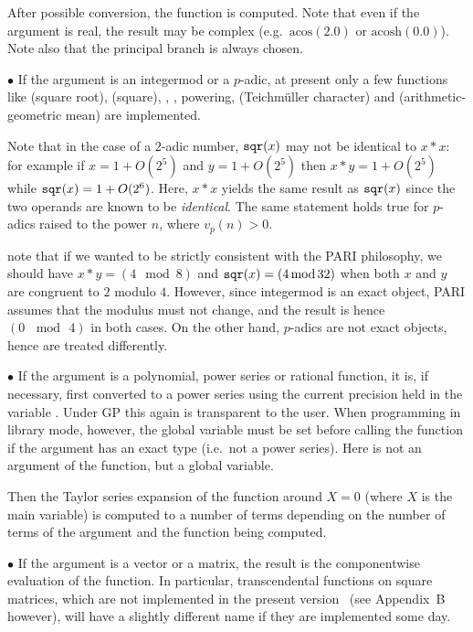 After possible conversion, the function is computed. Note that even if the
argument is real, the result may be complex (e.g.~$\text{acos}(2.0)$ or
$\text{acosh}(0.0)$). Note also that the principal branch is always chosen.

$\bullet$ If the argument is an integermod or a $p$-adic, at present only a
few functions like  (square root),  (square), ,
, powering,  (Teichm\"uller character) and
 (arithmetic-geometric mean) are implemented.

Note that in the case of a $2$-adic number, ${\tt sqr}(x)$ may not be
identical to $x*x$: for example if $x = 1+O(2^5)$ and $y = 1+O(2^5)$ then
$x*y = 1+O(2^5)$ while ${\tt sqr}(x) = 1+O(2^6)$. Here, $x * x$ yields the
same result as ${\tt sqr}(x)$ since the two operands are known to be
\emph{identical}. The same statement holds true for $p$-adics raised to the
power $n$, where $v_p(n) > 0$.

 note that if we wanted to be strictly consistent with
the PARI philosophy, we should have $x*y = (4 \mod 8)$ and ${\tt sqr}(x) =
(4 \,{\rm mod}\, 32)$ when both $x$ and $y$ are congruent to $2$ modulo $4$.
However, since integermod is an exact object, PARI assumes that the modulus
must not change, and the result is hence $(0\, \mod\, 4)$ in both cases. On
the other hand, $p$-adics are not exact objects, hence are treated
differently.

$\bullet$ If the argument is a polynomial, power series or rational function,
it is, if necessary, first converted to a power series using the current
precision held in the variable . Under GP this again is
transparent to the user. When programming in library mode, however, the
global variable  must be set before calling the function if the
argument has an exact type (i.e.~not a power series). Here  is
not an argument of the function, but a global variable.

Then the Taylor series expansion of the function around $X=0$ (where $X$ is
the main variable) is computed to a number of terms depending on the number
of terms of the argument and the function being computed.

$\bullet$ If the argument is a vector or a matrix, the result is the
componentwise evaluation of the function. In particular, transcendental
functions on square matrices, which are not implemented in the present
version \vers\ (see Appendix~B however), will have a slightly different name
if they are implemented some day.


